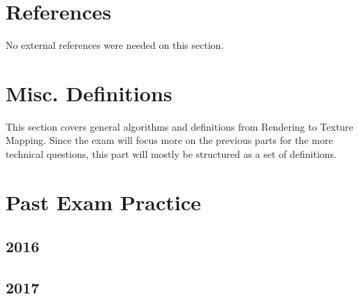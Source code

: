 \section{References}
No external references were needed on this section.
\newpage
\section{Misc. Definitions}
This section covers general algorithms and definitions from Rendering to Texture Mapping. Since the exam will focus more on the previous parts for the more technical questions, this part will mostly be structured as a set of definitions.
\newpage
\section{Past Exam Practice}
\subsection{2016}
\subsection{2017}